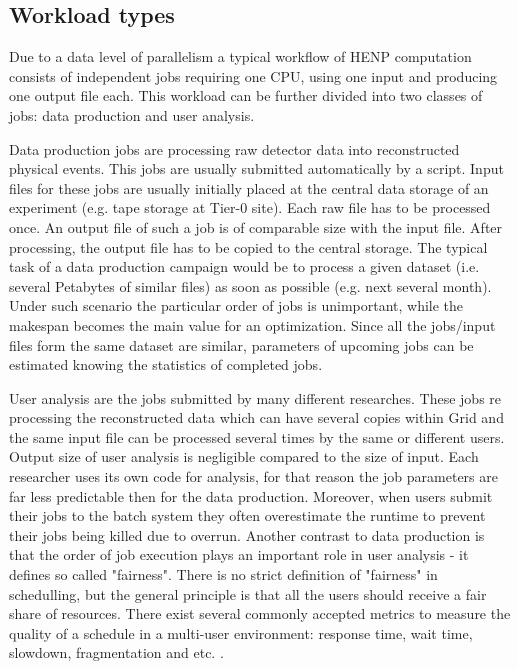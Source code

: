 \documentclass[english]{ddny}
\begin{document}
\subsection{Workload types}
Due to a data level of parallelism a typical workflow of HENP computation
consists of independent jobs requiring one CPU,  using one input and producing one output file each. This workload can be further divided into two classes of jobs: data production and user analysis.

Data production jobs are processing raw detector data into reconstructed physical events. This jobs are usually submitted automatically by a script. Input files for these jobs are usually initially placed at the central data storage of an experiment (e.g. tape storage at Tier-0 site). Each raw file has to be processed once. An output file of such a job is of comparable size with the input file. After processing, the output file has to be copied to the central storage. The typical task of a data production campaign would be to process a given dataset (i.e. several Petabytes of similar files) as soon as possible (e.g. next several month). Under such scenario the particular order of jobs is unimportant, while the makespan becomes the main value for an optimization. Since all the jobs/input files form the same dataset are similar, parameters of upcoming jobs can be estimated knowing the statistics of completed jobs.

User analysis are the jobs submitted by many different researches. These jobs re processing the reconstructed data which can have several copies within Grid and the same input file can be processed several times by the same or different users. Output size of user analysis is negligible compared to the size of input. Each researcher uses its own code for analysis, for that reason the job parameters are far less predictable then for the data production. Moreover, when users submit their jobs to the batch system they often overestimate the runtime  to prevent their jobs being killed due to overrun.  Another contrast to data production is that the order of job execution plays an important role in user analysis - it defines so called "fairness". There is no strict definition of "fairness" in schedulling, but the general principle is that all the users should receive a fair share of resources. There exist several commonly accepted metrics to measure the quality of a schedule in a multi-user environment: response time, wait time, slowdown, fragmentation and etc. \cite{Rudova_Tabu_search}. 
\end{document}
